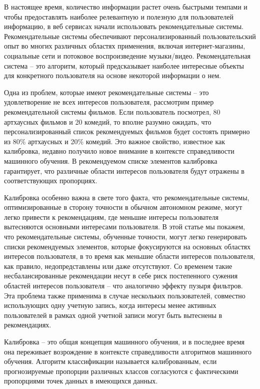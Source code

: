 

В настоящее время, количество информации растет очень быстрыми 
темпами и чтобы предоставлять наиболее релевантную и полезную 
для пользователей информацию, 
в веб сервисах начали использовать рекомендательные системы.  
Рекомендательные системы обеспечивают персонализированный 
пользовательский опыт во многих различных областях применения, 
включая интернет-магазины, социальные сети и потоковое
воспроизведение музыки/видео.  
Рекомендательная система -- это алгоритм, который предсказывает
 наиболее интересные
 объекты для конкретного пользователя на основе некоторой 
 информации о нем.

 Одна из проблем, которые имеют рекомендательные системы -- это 
 удовлетворение не всех интересов пользователя, рассмотрим пример 
 рекомендательной системы фильмов.
 Если пользователь посмотрел, 80 артхаусных фильмов и 20 
 комедий, то вполне разумно ожидать, что персонализированный 
 список рекомендуемых фильмов будет состоять примерно из 80\% 
 артхаусных и 20\% комедий. Это важное свойство, известное 
 как калибровка, недавно получило новое внимание в контексте 
 справедливости машинного обучения. В рекомендуемом списке 
 элементов калибровка гарантирует, что различные области 
 интересов пользователя будут отражены в соответствующих
  пропорциях. 
  
  Калибровка особенно важна в свете того факта,
   что рекомендательные системы, оптимизированные в сторону
    точности
  в обычном автономном режиме, могут легко привести к 
  рекомендациям, где меньшие интересы пользователя 
  вытесняются основными интересами пользователя.
 В этой статье мы покажем, что рекомендательные системы,
  обученные точности, могут легко генерировать списки 
  рекомендуемых элементов, которые фокусируются на основных 
  областях интересов пользователя, в то время как меньшие
   области интересов пользователя, как правило, недопредставлены 
   или даже отсутствуют. 
 Со временем такие несбалансированные рекомендации несут 
 в себе риск постепенного сужения областей интересов 
 пользователя -- что аналогично эффекту пузыря фильтров.
  Эта проблема также применима в случае нескольких пользователей,
   совместно использующих одну учетную запись, когда интересы 
   менее активных пользователей в рамках одной учетной записи 
   могут быть вытеснены в рекомендациях.

 Калибровка -- это общая концепция машинного обучения, 
 и в последнее время она переживает возрождение в 
 контексте справедливости алгоритмов машинного обучения.
  Алгоритм классификации называется калиброванным, если 
  прогнозируемые пропорции различных классов согласуются 
  с фактическими пропорциями точек данных в имеющихся данных. 
